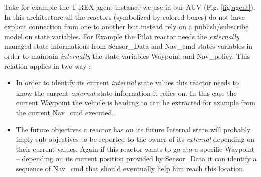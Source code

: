 Take for example the T-REX agent instance we use in our AUV
(Fig. \ref{fig:agent}). In this architecture all the reactors
(symbolized by colored boxes) do not have explicit connection from one
to another but instead rely on a publish/subscribe model on state
variables. For Example the \textsf{Pilot} reactor needs the {\em
  externally} managed state informations from \textsf{Sensor\_Data} 
and \textsf{Nav\_cmd} states variables in order to maintain {\em
  internally} the state variables \textsf{Waypoint} and
\textsf{Nav\_policy}. This relation applies in two way :
\begin{itemize}
\item In order to identify its current {\em internal} state values
  this reactor needs to know the current {\em external} state
  information it relies on. In this case the current \textsf{Waypoint}
  the vehicle is heading to can be extracted for example from the
  current \textsf{Nav\_cmd} executed.
\item The future objectives a reactor has on its future \textsf{Internal}
  state will probably imply sub-objectives to be reported to the
  owner of its {\em external} depending on their current values. Again
  if this reactor wants to go ato a specific \textsf{Waypoint} --
  depending on its current position provided by \textsf{Sensor\_Data}
  it can identify a sequence of \textsf{Nav\_cmd} that should
  eventually help him reach this location.
\end{itemize}

